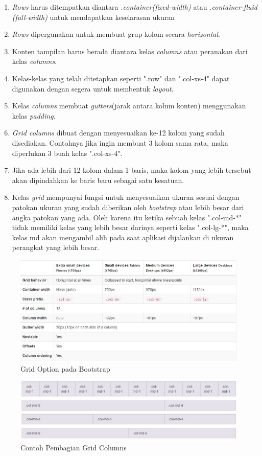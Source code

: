 	\begin{enumerate}
		\item \textit{Rows} harus ditempatkan diantara \textit{.container(fixed-width)} atau \textit{.container-fluid (full-width)} untuk mendapatkan keselarasan ukuran
		\item \textit{Rows} dipergunakan untuk membuat grup kolom secara \textit{horizontal}.
		\item Konten tampilan harus berada diantara kelas \textit{columns} atau peranakan dari kelas \textit{columns}.
		\item Kelas-kelas yang telah ditetapkan seperti ".row" dan ".col-xs-4" dapat digunakan dengan segera untuk membentuk \textit{layout}.
		\item Kelas \textit{columns} membuat \textit{gutters}(jarak antara kolum konten) menggunakan kelas \textit{padding}.
		\item \textit{Grid columns} dibuat dengan menyesuaikan ke-12 kolom yang sudah disediakan. Contohnya jika ingin membuat 3 kolom sama rata, maka diperlukan 3 buah kelas ".col-xs-4".
		\item Jika ada lebih dari 12 kolom dalam 1 baris, maka kolom yang lebih tersebut akan dipindahkan ke baris baru sebagai satu kesatuan.
		\item Kelas \textit{grid} mempunyai fungsi untuk menyesuaikan ukuran sesuai dengan patokan ukuran yang sudah diberikan oleh \textit{bootstrap} atau lebih besar dari angka patokan yang ada. Oleh karena itu ketika sebuah kelas ".col-md-*" tidak memiliki kelas yang lebih besar darinya seperti kelas ".col-lg-*", maka kelas md akan mengambil alih pada saat aplikasi dijalankan di ukuran perangkat yang lebih besar. 
	\end{enumerate}
		
		\begin{figure}[H]
			\centering
			\includegraphics[scale=0.75]{Gambar/gridOption}
			\caption{Grid Option pada Bootstrap}
			\label{fig:gridOpt}
		\end{figure}
		
		\begin{figure}[H]
			\centering
			\includegraphics[scale=0.75]{Gambar/kolom}
			\caption{Contoh Pembagian Grid Columns}
			\label{fig:gridCol}
		\end{figure}